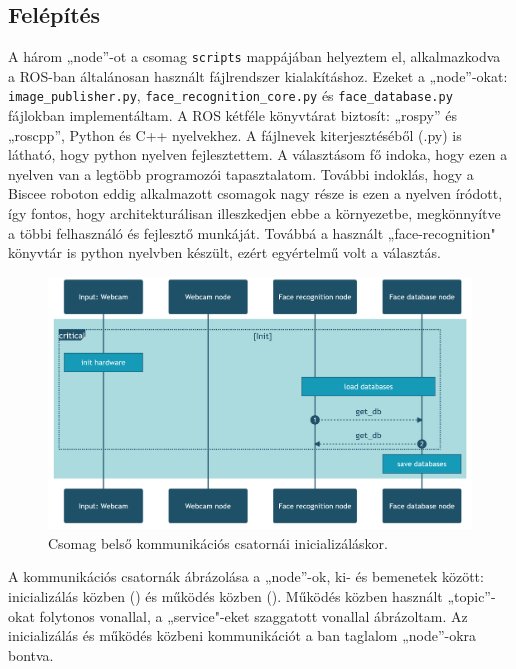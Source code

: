 \subsection{Felépítés}
A három „node”-ot a csomag \verb|scripts| mappájában helyeztem el, alkalmazkodva a ROS-ban általánosan használt fájlrendszer kialakításhoz. Ezeket a „node”-okat: \verb|image_publisher.py|,  \verb|face_recognition_core.py| és \verb|face_database.py| fájlokban implementáltam. A ROS kétféle könyvtárat biztosít: „rospy” és „roscpp”, Python és C++ nyelvekhez. A fájlnevek kiterjesztéséből (.py) is látható, hogy python nyelven fejlesztettem. A választásom fő indoka, hogy ezen a nyelven van a legtöbb programozói tapasztalatom. További indoklás, hogy a Biscee roboton eddig alkalmazott csomagok nagy része is ezen a nyelven íródott, így fontos, hogy architekturálisan illeszkedjen ebbe a környezetbe, megkönnyítve a többi felhasználó és fejlesztő munkáját. Továbbá a használt „face-recognition" könyvtár is python nyelvben készült, ezért egyértelmű volt a választás.
\begin{figure}[!ht]
    \centering
    \includegraphics[width=155mm, keepaspectratio]{02_mermaid/full_init2.png}
    \caption{Csomag belső kommunikációs csatornái inicializáláskor.}
    \label{fig:fullcomm1}
\end{figure}

A kommunikációs csatornák ábrázolása a „node”-ok, ki- és bemenetek között: inicializálás közben () és működés közben (). Működés közben használt „topic”-okat folytonos vonallal, a „service"-eket szaggatott vonallal ábrázoltam. Az inicializálás és működés közbeni kommunikációt a ban taglalom „node”-okra bontva.

